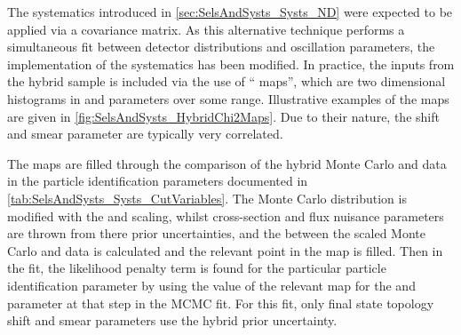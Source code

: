 The  systematics introduced in \autoref{sec:SelsAndSysts_Systs_ND} were expected to be applied via a covariance matrix. As this alternative technique performs a simultaneous fit between detector distributions and oscillation parameters, the implementation of the  systematics has been modified. In practice, the inputs from the hybrid  sample is included via the use of `` maps'', which are two dimensional histograms in \quickmath{\alpha} and \quickmath{\beta} parameters over some range. Illustrative examples of the  maps are given in \autoref{fig:SelsAndSysts_HybridChi2Maps}. Due to their nature, the shift and smear parameter are typically very correlated.

The maps are filled through the  comparison of the hybrid  Monte Carlo and data in the particle identification parameters documented in \autoref{tab:SelsAndSysts_Systs_CutVariables}. The Monte Carlo distribution is modified with the \quickmath{\alpha} and \quickmath{\beta} scaling, whilst cross-section and flux nuisance parameters are thrown from there prior uncertainties, and the  between the scaled Monte Carlo and data is calculated and the relevant point in the  map is filled. Then in the fit, the likelihood penalty term is found for the particular particle identification parameter by using the value of the relevant  map for the \quickmath{\alpha} and \quickmath{\beta} parameter at that step in the MCMC fit. For this fit, only  final state topology shift and smear parameters use the hybrid   prior uncertainty. 

